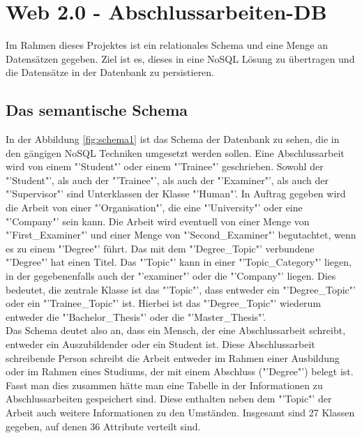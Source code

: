 \section{Web 2.0 - Abschlussarbeiten-DB}
Im Rahmen dieses Projektes ist ein relationales Schema und eine Menge an Datens\"atzen gegeben. Ziel ist es, dieses in eine NoSQL Lösung zu übertragen und die Datens\"atze in der Datenbank zu persistieren.

\subsection{Das semantische Schema}
In der Abbildung \ref{fig:schema1} ist das Schema der Datenbank zu sehen, die in den g\"angigen NoSQL Techniken umgesetzt werden sollen. Eine Abschlussarbeit wird von einem "'Student"' oder einem "'Trainee"' geschrieben. Sowohl der "'Student"', als auch der "'Trainee"', als auch der "'Examiner"', als auch der "'Supervisor"' sind Unterklassen der Klasse "'Human"'. In Auftrag gegeben wird die Arbeit von einer "'Organisation"', die eine "'University"' oder eine "'Company"' sein kann. Die Arbeit wird eventuell von einer Menge von "'First\_Examiner"' und einer Menge von "'Second\_Examiner"' begutachtet, wenn es zu einem "'Degree"' f\"uhrt. Das mit dem "'Degree\_Topic"' verbundene "'Degree"' hat einen Titel. Das "'Topic"' kann in einer "'Topic\_Category"' liegen, in der gegebenenfalls auch der "'examiner"' oder die "'Company"' liegen. Dies bedeutet, die zentrale Klasse ist das "'Topic"', dass entweder ein "'Degree\_Topic"' oder ein "'Trainee\_Topic"' ist. Hierbei ist das "'Degree\_Topic"' wiederum entweder die "'Bachelor\_Thesis"' oder die "'Master\_Thesis"'.\\

Das Schema deutet also an, dass ein Mensch, der eine Abschlussarbeit schreibt, entweder ein Auszubildender oder ein Student ist. Diese Abschlussarbeit schreibende Person schreibt die Arbeit entweder im Rahmen einer Ausbildung oder im Rahmen eines Studiums, der mit einem Abschluss ("'Degree"') belegt ist. Fasst man dies zusammen h\"atte man eine Tabelle in der Informationen zu Abschlussarbeiten gespeichert sind. Diese enthalten neben dem "'Topic"' der Arbeit auch weitere Informationen zu den Umst\"anden. Insgesamt sind 27 Klassen gegeben, auf denen 36 Attribute verteilt sind.\\

